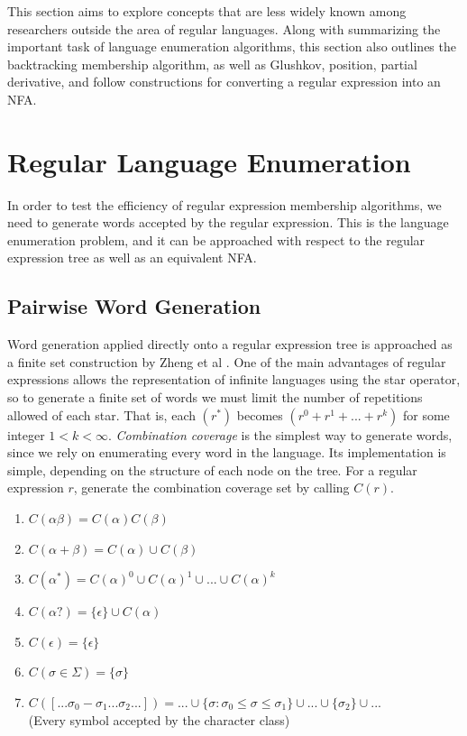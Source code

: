 This section aims to explore concepts that are less widely known among researchers outside the area of regular languages. Along with summarizing the important task of language enumeration algorithms, this section also outlines the backtracking membership algorithm, as well as Glushkov, position, partial derivative, and follow constructions for converting a regular expression into an NFA.


\section{Regular Language Enumeration}
\label{sec:Regular Language Enumeration}
In order to test the efficiency of regular expression membership algorithms, we need to generate words accepted by the regular expression. This is the language enumeration problem, and it can be approached with respect to the regular expression tree as well as an equivalent NFA.

\subsection{Pairwise Word Generation}
\label{subsec:Pairwise Word Generation}
Word generation applied directly onto a regular expression tree is approached as a finite set construction by Zheng et al \cite{pairgen}. One of the main advantages of regular expressions allows the representation of infinite languages using the star operator, so to generate a finite set of words we must limit the number of repetitions allowed of each star. That is, each $(r^*)$ becomes $(r^0 + r^1 + ... + r^k)$ for some integer $1 < k < \infty$. \emph{Combination coverage} is the simplest way to generate words, since we rely on enumerating every word in the language. Its implementation is simple, depending on the structure of each node on the tree. For a regular expression $r$, generate the combination coverage set by calling $C(r)$.

\begin{enumerate}
  \item $C(\alpha \beta) = C(\alpha) C(\beta)$
  \item $C(\alpha + \beta) = C(\alpha) \cup C(\beta)$
  \item $C(\alpha^*) = C(\alpha)^0 \cup C(\alpha)^1 \cup ... \cup C(\alpha)^k$
  \item $C(\alpha?) = \{\epsilon\} \cup C(\alpha)$
  \item $C(\epsilon) = \{\epsilon\}$
  \item $C(\sigma\in\Sigma) = \{\sigma\}$ 
  \item $C( [...\sigma_0-\sigma_1...\sigma_2...]) = ... \cup \{\sigma : \sigma_0 \leq \sigma \leq \sigma_1\} \cup ... \cup \{\sigma_2\} \cup ...$ \\
      (Every symbol accepted by the character class)
\end{enumerate}

